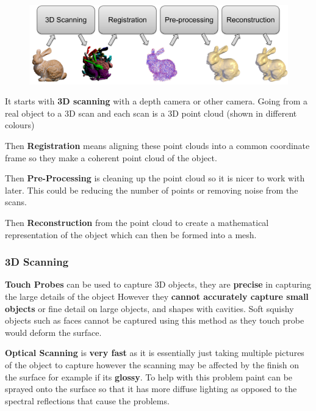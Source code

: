 \documentclass{article}
\begin{document}
\begin{figure}[!ht]
    \centering
    \includegraphics[width=0.8\linewidth]{images/digitization.png}
\end{figure}

It starts with \textbf{3D scanning} with a depth camera or other camera. Going from a real object to a 3D scan
and each scan is a 3D point cloud (shown in different colours)

\vspace{5px}

Then \textbf{Registration} means aligning these point clouds into a common coordinate frame so they make
a coherent point cloud of the object.

\vspace{5px}

Then \textbf{Pre-Processing} is cleaning up the point cloud so it is nicer to work with later. This could be 
reducing the number of points or removing noise from the scans.

\vspace{5px}

Then \textbf{Reconstruction} from the point cloud to create a mathematical representation of the object which can then 
be formed into a mesh.

\vspace{10px}

\subsubsection{3D Scanning}

\vspace{5px}

\textbf{Touch Probes} can be used to capture 3D objects, they are \textbf{precise} in capturing the large details of the object
However they \textbf{cannot accurately capture small objects} or fine detail on large objects, and shapes with cavities.
Soft squishy objects such as faces cannot be captured using this method as they touch probe would deform the surface.


\vspace{5px}

\textbf{Optical Scanning} is \textbf{very fast} as it is essentially just taking multiple pictures of the object to capture
however the scanning may be affected by the finish on the surface for example if its \textbf{glossy}. To help
with this problem paint can be sprayed onto the surface so that it has more diffuse lighting as opposed to 
the spectral reflections that cause the problems.
\end{document}
